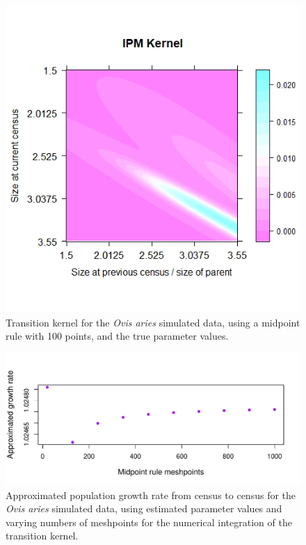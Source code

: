 \documentclass[a4paper,12pt]{article}
\begin{document}
\begin{figure}
\centering
  \includegraphics[scale = 0.482]{ungulateTrueKern.jpg}
  \caption{\label{ungTruKern}Transition kernel for the \textit{Ovis aries} simulated data, using a midpoint rule with 100 points, and the true parameter values.}
\end{figure}



\begin{figure}[H]
\centering
\includegraphics[scale=0.9]{growthRateMesh.pdf}
\caption{\label{grMesh}Approximated population growth rate from census to census for the \textit{Ovis aries} simulated data, using estimated parameter values and varying numbers of meshpoints for the numerical integration of the transition kernel.}
\end{figure}
\end{document}
